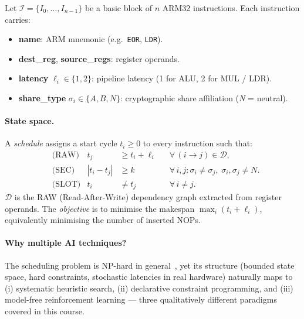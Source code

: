 \documentclass[letterpaper]{article}
\begin{document}
Let $\mathcal{I} = \{I_0, \ldots, I_{n-1}\}$ be a basic block of $n$
ARM32 instructions.  Each instruction carries:
\begin{itemize}\setlength\itemsep{0pt}
  \item \textbf{name}: ARM mnemonic (e.g.\ \texttt{EOR}, \texttt{LDR}).
  \item \textbf{dest\_reg}, \textbf{source\_regs}: register operands.
  \item \textbf{latency} $\ell_i \in \{1, 2\}$: pipeline latency
        (1 for ALU, 2 for MUL / LDR).
  \item \textbf{share\_type} $\sigma_i \in \{A, B, N\}$: cryptographic
        share affiliation (\textit{N} = neutral).
\end{itemize}

\paragraph{State space.}
A \emph{schedule} assigns a start cycle $t_i \ge 0$ to every
instruction such that:
\begin{align}
   & \text{(RAW)}  & t_j                                                                               & \ge t_i + \ell_i
   &               & \forall\, (i \to j) \in \mathcal{D}, \label{eq:raw}                                                  \\
   & \text{(SEC)}  & |t_i - t_j|                                                                       & \ge k
   &               & \forall\, i,j : \sigma_i \ne \sigma_j,\; \sigma_i, \sigma_j \ne N. \label{eq:sec}                    \\
   & \text{(SLOT)} & t_i                                                                               & \ne t_j
   &               & \forall\, i \ne j. \label{eq:slot}
\end{align}
$\mathcal{D}$ is the RAW (Read-After-Write) dependency graph extracted
from register operands.  The \emph{objective} is to minimise the
makespan $\max_i(t_i + \ell_i)$, equivalently minimising the number of
inserted NOPs.

\paragraph{Why multiple AI techniques?}
The scheduling problem is NP-hard in general~\cite{ullman1975}, yet its
structure (bounded state space, hard constraints, stochastic latencies in
real hardware) naturally maps to (i) systematic heuristic search, (ii)
declarative constraint programming, and (iii) model-free reinforcement
learning — three qualitatively different paradigms covered in this
course.
\end{document}
